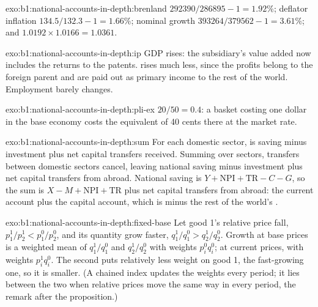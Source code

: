 \begin{solution}{exo:b1:national-accounts-in-depth:brenland}
 $292390/286895 - 1 = 1.92\%$; deflator inflation $134.5/132.3 - 1 = 1.66\%$; nominal
growth $393264/379562 - 1 = 3.61\%$; and $1.0192 \times 1.0166 = 1.0361$.
\end{solution}

\begin{solution}{exo:b1:national-accounts-in-depth:ip}
GDP rises: the subsidiary's value added now includes the returns to the
patents.  rises much less, since the profits belong to the foreign
parent and are paid out as primary income to the rest of the world.
Employment barely changes.
\end{solution}

\begin{solution}{exo:b1:national-accounts-in-depth:pli-ex}
$20/50 = 0.4$: a basket costing one dollar in the base economy costs the
equivalent of 40 cents there at the market rate.
\end{solution}

\begin{solution}{exo:b1:national-accounts-in-depth:sum}
For each domestic sector,  is saving minus investment plus net
capital transfers received. Summing over sectors, transfers between
domestic sectors cancel, leaving national saving minus investment plus net
capital transfers from abroad. National saving is $Y + \mathrm{NPI} + \mathrm{TR} - C - G$, so the
sum is $X - M + \mathrm{NPI} + \mathrm{TR}$ plus net capital transfers from abroad: the current
account plus the capital account, which is minus the rest of the world's
.
\end{solution}

\begin{solution}{exo:b1:national-accounts-in-depth:fixed-base}
Let good 1's relative price fall, $p_1^1/p_2^1 < p_1^0/p_2^0$, and its quantity grow faster,
$q_1^1/q_1^0 > q_2^1/q_2^0$. Growth at base prices is a weighted mean of $q_1^1/q_1^0$ and
$q_2^1/q_2^0$ with weights $p_i^0q_i^0$; at current prices, with weights $p_i^1q_i^0$. The second
puts relatively less weight on good 1, the fast-growing one, so it is
smaller. (A chained index updates the weights every period; it lies
between the two when relative prices move the same way in every period,
the remark after the proposition.)
\end{solution}

